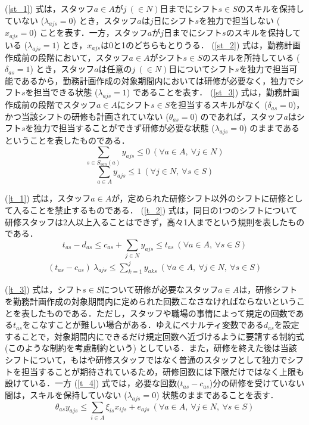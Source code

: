 \documentclass[11pt]{jsarticle}
\begin{document}
(\ref{st_1}) 式は，スタッフ$a \in A$が$j \ (\in N)$日までにシフト$s \in S$のスキルを保持していない ($\lambda_{ajs} = 0$) とき，スタッフ$a$は$j$日にシフト$s$を独力で担当しない ($x_{ajs} = 0$) ことを表す．一方，スタッフ$a$が$j$日までにシフト$s$のスキルを保持している ($\lambda_{ajs} = 1$) とき，$x_{ajs}$は0と1のどちらもとりうる． (\ref{st_2}) 式は，勤務計画作成前の段階において，スタッフ$a \in A$がシフト$s \in S$のスキルを所持している ($\delta_{as} = 1$) とき，スタッフ$a$は任意の$j \ (\in N)$日についてシフト$s$を独力で担当可能であるから，勤務計画作成の対象期間内においては研修が必要なく，独力でシフト$s$を担当できる状態 ($\lambda_{ajs} = 1$) であることを表す． (\ref{st_3}) 式は，勤務計画作成前の段階でスタッフ$a \in A$にシフト$s \in S$を担当するスキルがなく ($\delta_{as} = 0$)，かつ当該シフトの研修も計画されていない ($\theta_{as} = 0$) のであれば，スタッフ$a$はシフト$s$を独力で担当することができず研修が必要な状態 ($\lambda_{ajs} = 0$) のままであるということを表したものである．
\begin{equation}
\sum_{s \in S_{ban}(a)} y_{ajs} \leq 0 \ (\forall a \in A, \ \forall j \in N)
\label{t_1}
\end{equation}
\begin{equation}
\sum_{a \in A} y_{ajs} \leq 1 \ (\forall j \in N, \ \forall s \in S)
\label{t_2}
\end{equation}

(\ref{t_1}) 式は，スタッフ$a \in A$が，定められた研修シフト以外のシフトに研修として入ることを禁止するものである． (\ref{t_2}) 式は，同日の1つのシフトについて研修スタッフは2人以上入ることはできず，高々1人までという規則を表したものである．
\begin{equation}
t_{as} - d_{as} \leq c_{as} + \sum_{j \in N} y_{ajs} \leq t_{as} \ (\forall a \in A, \ \forall s \in S)
\label{t_3}
\end{equation}
\begin{eqnarray}
(t_{as} - c_{as}) \ \lambda_{ajs} \leq \sum_{k = 1}^{j} y_{aks} \ (\forall a \in A, \ \forall j \in N, \ \forall s \in S)
\label{t_4}
\end{eqnarray}

(\ref{t_3}) 式は，シフト$s \in S$について研修が必要なスタッフ$a \in A$は，研修シフトを勤務計画作成の対象期間内に定められた回数こなさなければならないということを表したものである．ただし，スタッフや職場の事情によって規定の回数である$t_{as}$をこなすことが難しい場合がある．ゆえにペナルティ変数である$d_{as}$を設定することで，対象期間内にできるだけ規定回数へ近づけるように要請する制約式 (このような制約を考慮制約という) としている．また，研修を終えた後は当該シフトについて，もはや研修スタッフではなく普通のスタッフとして独力でシフトを担当することが期待されているため，研修回数には下限だけではなく上限も設けている．一方 (\ref{t_4}) 式では，必要な回数($t_{as} - c_{as}$)分の研修を受けていない間は，スキルを保持していない ($\lambda_{ajs} = 0$) 状態のままであることを表す．
\begin{equation}
\theta_{as} y_{ajs} \leq \sum_{i \in A} \xi_{is} x_{ijs} + e_{ajs} \ (\forall a \in A, \ \forall j \in N, \ \forall s \in S)
\label{t_5}
\end{equation}
\end{document}
